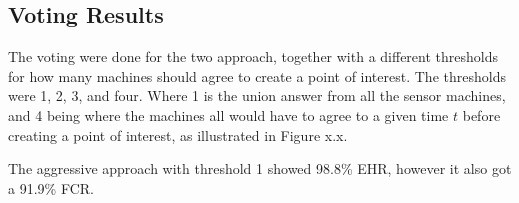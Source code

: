 \subsection{Voting Results}
The voting were done for the two approach, together with a different thresholds for how many machines should agree to create a point of interest.
The thresholds were 1, 2, 3, and four. Where 1 is the union answer from all the sensor machines, and 4 being where the machines all would have to agree to a given time $t$ before creating a point of interest, as illustrated in Figure x.x.

The aggressive approach with threshold 1 showed 98.8\% EHR, however it also got a 91.9\% FCR.  







